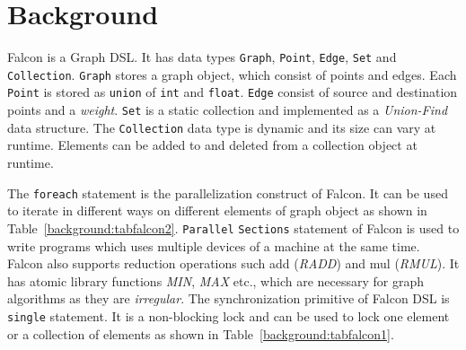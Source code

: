 \documentclass[12pt]{article}
\begin{document}
\section{Background}\label{sec:background}

Falcon is a Graph DSL. It has data types {\tt Graph}, {\tt Point}, {\tt Edge}, {\tt Set} and {\tt Collection}. \texttt{Graph} stores a graph object, which consist of points and edges. Each {\tt Point} is stored as {\tt union} of   {\tt int} and {\tt float}.
{\tt Edge} consist of source and destination points and  a {\it weight}. {\tt Set} is a static collection and implemented as a {\it Union-Find} data structure. The {\tt Collection} data type is dynamic and its size can vary at runtime. Elements can be added to  and deleted from a collection object at runtime.

 The {\tt foreach} statement is the parallelization construct of Falcon.
 It can be used to  iterate in different ways on different elements of graph object as  shown in Table~\ref{background:tabfalcon2}. 
{\tt Parallel} {\tt  Sections} statement of Falcon is used to write programs which uses multiple devices of a machine at the same time. Falcon also supports reduction operations such add ({\it RADD}) and mul ({\it RMUL}). It  has atomic library functions {\it MIN}, {\it MAX} etc., which are necessary for graph algorithms as they are {\it irregular}. 
The synchronization primitive of Falcon DSL is {\tt single} statement.
 It is a non-blocking lock and can be used to lock one element or a collection of elements as shown in Table~\ref{background:tabfalcon1}.
\end{document}

